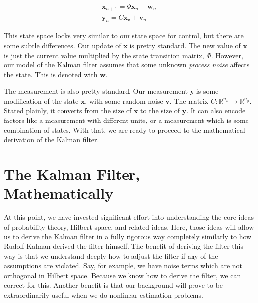 \begin{gather}
\bm{{x}}_{n+1}=\Phi\bm{x}_n+\bm{w}_n\\
\bm{y}_n=C\bm{x}_n+\bm{v}_n
\end{gather}

This state space looks very similar to our state space for control, but there are some subtle differences. Our update of $\bm{x}$ is pretty standard. The new value of $\bm{x}$ is just the current value multiplied by the state transition matrix, $\Phi$. However, our model of the Kalman filter assumes that some unknown \textit{process noise} affects the state. This is denoted with $\bm{w}$.

The measurement is also pretty standard. Our measurement $\bm{y}$ is some modification of the state $\bm{x}$, with some random noise $\bm{v}$. The matrix $C:\mathbb{R}^{n_x}\rightarrow\mathbb{R}^{n_y}$. Stated plainly, it converts from the size of $\bm{x}$ to the size of $\bm{y}$. It can also encode factors like a measurement with different units, or a measurement which is some combination of states. With that, we are ready to proceed to the mathematical derivation of the Kalman filter.


\section{The Kalman Filter, Mathematically}\label{Kalman Filter math}

At this point, we have invested significant effort into understanding the core ideas of probability theory, Hilbert space, and related ideas. Here, those ideas will allow us to derive the Kalman filter in a fully rigorous way completely similarly to how Rudolf Kalman derived the filter himself. The benefit of deriving the filter this way is that we understand deeply how to adjust the filter if any of the assumptions are violated. Say, for example, we have noise terms which are not orthogonal in Hilbert space. Because we know how to derive the filter, we can correct for this. Another benefit is that our background will prove to be extraordinarily useful when we do nonlinear estimation problems.



